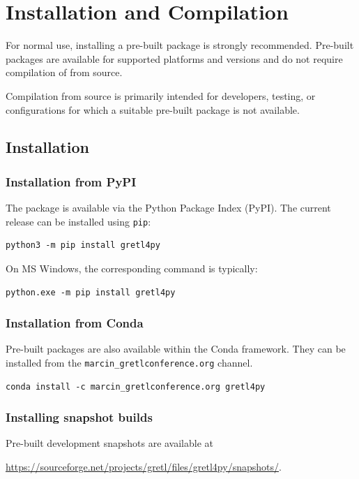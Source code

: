 \chapter{Installation and Compilation}\label{sec:installation}
For normal use, installing a pre-built \gretlpy package is strongly
recommended. Pre-built packages are available for supported platforms
and \python versions and do not require compilation of \gretlpy from
source.

Compilation from source is primarily intended for developers, testing,
or configurations for which a suitable pre-built package is not
available.


\section{Installation}\label{sec:install}
\subsection{Installation from PyPI}
The \gretlpy package is available via the Python Package Index (PyPI).
The current release can be installed using \texttt{pip}:

\begin{verbatim}
python3 -m pip install gretl4py
\end{verbatim}

On MS Windows, the corresponding command is typically:

\begin{verbatim}
python.exe -m pip install gretl4py
\end{verbatim}


\subsection{Installation from Conda}
Pre-built \gretlpy packages are also available within the Conda
framework. They can be installed from the \texttt{marcin\_gretlconference.org}
channel.

\begin{verbatim}
conda install -c marcin_gretlconference.org gretl4py
\end{verbatim}


\subsection{Installing snapshot builds}
Pre-built development snapshots are available at

\begin{center}
	\url{https://sourceforge.net/projects/gretl/files/gretl4py/snapshots/}.
\end{center}

